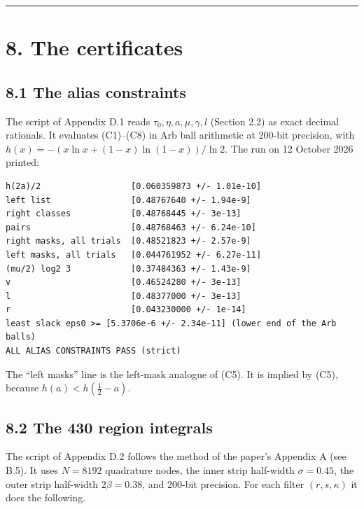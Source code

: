 \documentclass[10pt,a4paper]{article}
\begin{document}
\medskip\noindent\rule{\linewidth}{0.4pt}\medskip

\section*{8. The certificates}

\subsection*{8.1 The alias constraints}

The script of Appendix D.1 reads $\tau_0, \eta, a, \mu, \gamma, l$ (Section 2.2) as exact decimal
rationals. It evaluates (C1)--(C8) in Arb ball arithmetic at 200-bit precision, with
$h(x) = -(x\ln x + (1-x)\ln(1-x))/\ln2$. The run on 12 October 2026 printed:

\begin{lstlisting}
h(2a)/2                  [0.060359873 +/- 1.01e-10]
left list                [0.48767640 +/- 1.94e-9]
right classes            [0.48768445 +/- 3e-13]
pairs                    [0.48768463 +/- 6.24e-10]
right masks, all trials  [0.48521823 +/- 2.57e-9]
left masks, all trials   [0.044761952 +/- 6.27e-11]
(mu/2) log2 3            [0.37484363 +/- 1.43e-9]
v                        [0.46524280 +/- 3e-13]
l                        [0.48377000 +/- 3e-13]
r                        [0.043230000 +/- 1e-14]
least slack eps0 >= [5.3706e-6 +/- 2.34e-11] (lower end of the Arb balls)
ALL ALIAS CONSTRAINTS PASS (strict)
\end{lstlisting}

The ``left masks'' line is the left-mask analogue of (C5). It is implied by (C5), because $h(a) < h(\tfrac12 - a)$.

\subsection*{8.2 The 430 region integrals}

The script of Appendix D.2 follows the method of the paper's Appendix A (see B.5). It uses $N = 8192$ quadrature nodes, the inner
strip half-width $\sigma = 0.45$, the outer strip half-width $2\beta = 0.38$, and 200-bit precision. For each filter
$(r, s, \kappa)$ it does the following.
\end{document}
